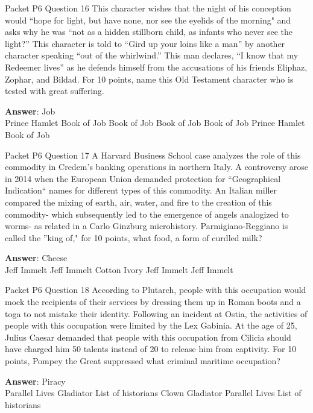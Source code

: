 \begin{frame}{Packet P6 Question 16}
This character wishes that the night of his   conception would “hope for light, but have none, nor see the eyelids of the morning" and asks why he was “not as a hidden stillborn child, as infants who never see the light?” This character is told to “Gird up your loins like a man” by another character speaking “out of the whirlwind.” This man declares, “I know that my Redeemer lives” as he defends himself from the accusations of his friends Eliphaz, Zophar, and     Bildad. For 10 points, name this Old Testament character who is tested with great suffering.        

\textbf{Answer}: Job\\
 Prince Hamlet
 Book of Job
 Book of Job
 Book of Job
 Book of Job
 Prince Hamlet
 Book of Job
\end{frame}

\begin{frame}{Packet P6 Question 17}
A Harvard Business School   case analyzes the   role of this commodity in Credem's banking operations in northern Italy. A controversy arose in 2014 when the European Union demanded protection for “Geographical Indication`` names for different types of this commodity. An Italian miller compared the mixing of earth, air, water, and fire to the creation of this commodity- which subsequently led to the emergence of angels analogized to worms- as related in a Carlo Ginzburg microhistory. Parmigiano-Reggiano is called the ''king of," for 10 points, what food, a form of curdled milk?        

\textbf{Answer}: Cheese\\
 Jeff Immelt
 Jeff Immelt
 Cotton
 Ivory
 Jeff Immelt
 Jeff Immelt
\end{frame}

\begin{frame}{Packet P6 Question 18}
According to Plutarch,   people with this occupation would mock the recipients of their services by dressing them up in Roman boots and a toga to   not mistake their identity. Following an incident at Ostia, the activities of people with this occupation were limited by the Lex Gabinia. At the age of 25, Julius Caesar demanded that people with this occupation from Cilicia should have charged him 50 talents   instead of 20 to release him from captivity. For 10 points, Pompey the Great suppressed what criminal maritime occupation?        

\textbf{Answer}: Piracy\\
 Parallel Lives
 Gladiator
 List of historians
 Clown
 Gladiator
 Parallel Lives
 List of historians
\end{frame}

